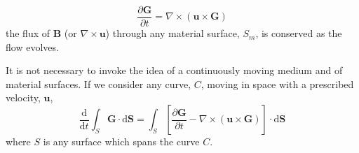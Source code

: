 \documentclass[12pt,a4paper]{article}
\renewcommand{\vec}[1]{\boldsymbol{#1}}
\newcommand{\dif}{\mathrm{d}}
\begin{document}
\begin{equation}
\frac{\partial \vec{G}}{\partial t} = \nabla \times (\vec{u}\times \vec{G}) 
\end{equation}
the flux of $\vec{B}$ (or $\nabla \times \vec{u}$) through any material surface, $S_m$, is conserved as the flow evolves.

It is not necessary to invoke the idea of a continuously moving medium and of material surfaces. If we consider any curve, $C$, moving in space with a prescribed velocity, $\vec{u}$,
\begin{equation}
\frac{\dif }{\dif t} \int_{S} \vec{G} \cdot \dif \vec{S} = \int_{S} \left[\frac{\partial \vec{G}}{\partial t} - \nabla \times (\vec{u}\times \vec{G})\right] \cdot \dif \vec{S}
\end{equation}
where $S$ is any surface which spans the curve $C$.
\end{document}
